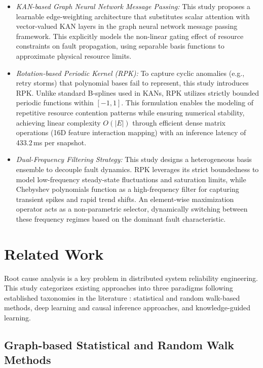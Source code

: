 \documentclass[conference]{IEEEtran}
\begin{document}
\begin{itemize}
    \item \textit{KAN-based Graph Neural Network Message Passing:} This study proposes a learnable edge-weighting architecture that substitutes scalar attention with vector-valued KAN layers in the graph neural network message passing framework. This explicitly models the non-linear gating effect of resource constraints on fault propagation, using separable basis functions to approximate physical resource limits.
    
    \item \textit{Rotation-based Periodic Kernel (RPK):} To capture cyclic anomalies (e.g., retry storms) that polynomial bases fail to represent, this study introduces RPK. Unlike standard B-splines used in KANs, RPK utilizes strictly bounded periodic functions within $[-1, 1]$. This formulation enables the modeling of repetitive resource contention patterns while ensuring numerical stability, achieving linear complexity $O(|E|)$ through efficient dense matrix operations (16D feature interaction mapping) with an inference latency of 433.2\,ms per snapshot.
    
    \item \textit{Dual-Frequency Filtering Strategy:} This study designs a heterogeneous basis ensemble to decouple fault dynamics. RPK leverages its strict boundedness to model low-frequency steady-state fluctuations and saturation limits, while Chebyshev polynomials function as a high-frequency filter for capturing transient spikes and rapid trend shifts. An element-wise maximization operator acts as a non-parametric selector, dynamically switching between these frequency regimes based on the dominant fault characteristic.
\end{itemize}

\section{Related Work}

Root cause analysis is a key problem in distributed system reliability engineering. This study categorizes existing approaches into three paradigms following established taxonomies in the literature \cite{microrank2021,eadro2023}: statistical and random walk-based methods, deep learning and causal inference approaches, and knowledge-guided learning.

\subsection{Graph-based Statistical and Random Walk Methods}
\end{document}
